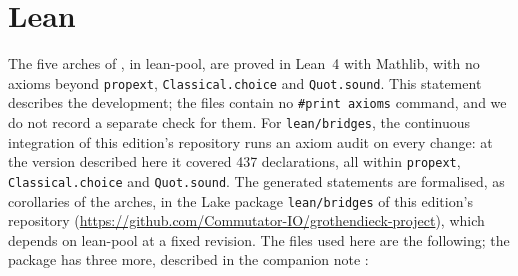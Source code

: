 \section{Lean}\label{sec:lean-lit}

The five arches of \lp{}, in lean-pool, are proved in Lean~4 with Mathlib, with no axioms beyond \texttt{propext}, \texttt{Classical.choice} and \texttt{Quot.sound}. This statement describes the development; the files contain no \texttt{\#print axioms} command, and we do not record a separate check for them. For \texttt{lean/bridges}, the continuous integration of this edition's repository runs an axiom audit on every change: at the version described here it covered 437 declarations, all within \texttt{propext}, \texttt{Classical.choice} and \texttt{Quot.sound}. The generated statements are formalised, as corollaries of the arches, in the Lake package \texttt{lean/bridges} of this edition's repository (\url{https://github.com/Commutator-IO/grothendieck-project}), which depends on lean-pool at a fixed revision. The files used here are the following; the package has three more, described in the companion note \cite{bridges-notes}:
